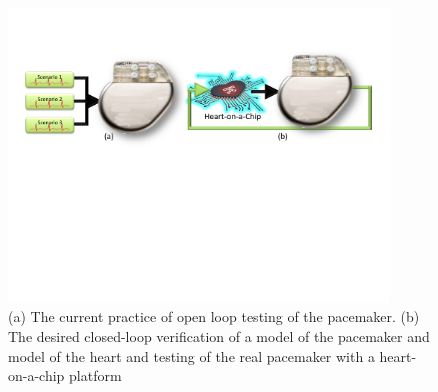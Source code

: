 
\begin{figure}[b]
		\centering
		\includegraphics[width=0.9\textwidth]{figs/closedloop.pdf}
		\caption{\small (a) The current practice of open loop testing of the pacemaker. (b) The desired closed-loop verification of a model of the pacemaker and model of the heart and testing of the real pacemaker with a heart-on-a-chip platform}
		\label{fig:closedloop}
\end{figure}



